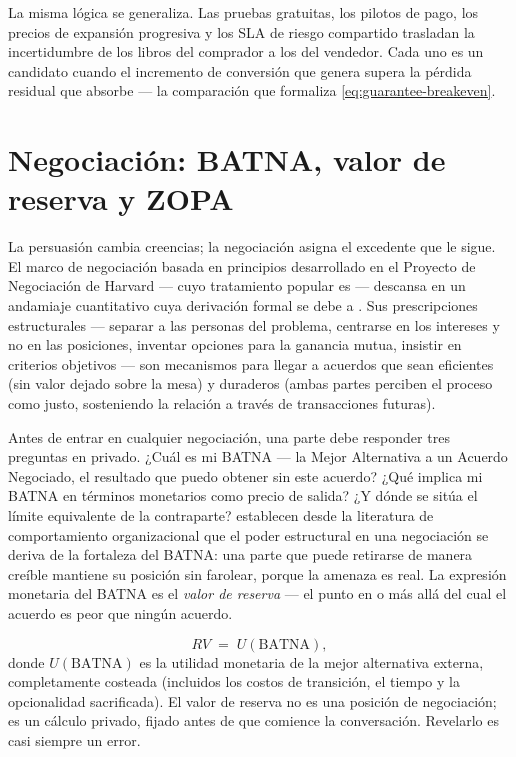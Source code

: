 La misma lógica se generaliza. Las pruebas gratuitas, los pilotos de pago, los precios de
expansión progresiva y los SLA de riesgo compartido trasladan la incertidumbre de los libros
del comprador a los del vendedor. Cada uno es un candidato cuando el incremento de conversión
que genera supera la pérdida residual que absorbe --- la comparación que formaliza
\cref{eq:guarantee-breakeven}.

\section{Negociación: BATNA, valor de reserva y ZOPA}\label{sec:negotiation}

La persuasión cambia creencias; la negociación asigna el excedente que le sigue. El marco de
negociación basada en principios desarrollado en el Proyecto de Negociación de Harvard ---
cuyo tratamiento popular es \textcite{fisher2011getting} --- descansa en un andamiaje
cuantitativo cuya derivación formal se debe a \textcite{raiffa1982art}. Sus prescripciones
estructurales --- separar a las personas del problema, centrarse en los intereses y no en las
posiciones, inventar opciones para la ganancia mutua, insistir en criterios objetivos ---
son mecanismos para llegar a acuerdos que sean eficientes (sin valor dejado sobre la mesa) y
duraderos (ambas partes perciben el proceso como justo, sosteniendo la relación a través de
transacciones futuras).

Antes de entrar en cualquier negociación, una parte debe responder tres preguntas en privado.
¿Cuál es mi BATNA --- la Mejor Alternativa a un Acuerdo Negociado, el resultado que puedo
obtener sin este acuerdo? ¿Qué implica mi BATNA en términos monetarios como precio de salida?
¿Y dónde se sitúa el límite equivalente de la contraparte? \textcite{kim2005power} establecen
desde la literatura de comportamiento organizacional que el poder estructural en una negociación
se deriva de la fortaleza del BATNA: una parte que puede retirarse de manera creíble mantiene
su posición sin farolear, porque la amenaza es real.
La expresión monetaria del BATNA es el \emph{valor de reserva} --- el punto en o más allá del
cual el acuerdo es peor que ningún acuerdo.

\begin{equation}\label{eq:reservation}
  RV \;=\; U(\mathrm{BATNA}),
\end{equation}
donde \(U(\mathrm{BATNA})\) es la utilidad monetaria de la mejor alternativa externa, completamente
costeada (incluidos los costos de transición, el tiempo y la opcionalidad sacrificada). El valor
de reserva no es una posición de negociación; es un cálculo privado, fijado antes de que comience
la conversación. Revelarlo es casi siempre un error.

